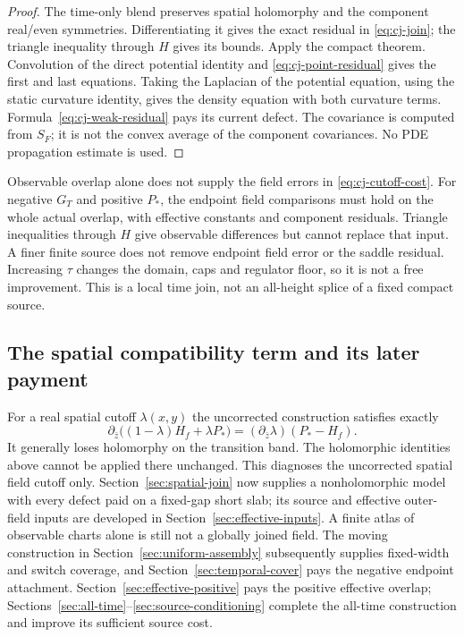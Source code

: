 \begin{proof}
The time-only blend preserves spatial holomorphy and the component
real/even symmetries. Differentiating it gives the exact residual in
\eqref{eq:cj-join}; the triangle inequality through $H$ gives its bounds.
Apply the compact theorem. Convolution of the direct potential identity
and \eqref{eq:cj-point-residual} gives the first and last equations.
Taking the Laplacian of the potential equation, using the static
curvature identity, gives the density equation with both curvature
terms. Formula~\eqref{eq:cj-weak-residual} pays its current defect.
The covariance is computed from $S_F$; it is not the convex average of
the component covariances. No PDE propagation estimate is used.
\end{proof}

Observable overlap alone does not supply the field errors in
\eqref{eq:cj-cutoff-cost}. For negative $G_T$ and positive $P_*$,
the endpoint field comparisons must hold on the whole actual overlap,
with effective constants and component residuals. Triangle inequalities
through $H$ give observable differences but cannot replace that input.
A finer finite source does not remove endpoint field error or the saddle
residual. Increasing $\tau$ changes the domain, caps and regulator floor,
so it is not a free improvement. This is a local time join, not an
all-height splice of a fixed compact source.

\subsection{The spatial compatibility term and its later payment}
For a real spatial cutoff $\lambda(x,y)$ the uncorrected construction
satisfies exactly
\begin{equation}
 \partial_{\bar z}\bigl((1-\lambda)H_f+\lambda P_*\bigr)
       =(\partial_{\bar z}\lambda)(P_*-H_f).
 \label{eq:cj-spatial-defect}
\end{equation}
It generally loses holomorphy on the transition band. The holomorphic
identities above cannot be applied there unchanged. This diagnoses the
uncorrected spatial field cutoff only. Section~\ref{sec:spatial-join}
now supplies a nonholomorphic model with every defect paid on a fixed-gap
short slab; its source and effective outer-field inputs are developed in
Section~\ref{sec:effective-inputs}. A finite atlas of observable charts
alone is still not a globally joined field. The moving construction in Section~\ref{sec:uniform-assembly}
subsequently supplies fixed-width and switch coverage, and
Section~\ref{sec:temporal-cover} pays the negative endpoint attachment.
Section~\ref{sec:effective-positive} pays the positive effective overlap;
Sections~\ref{sec:all-time}--\ref{sec:source-conditioning} complete the
all-time construction and improve its sufficient source cost.
